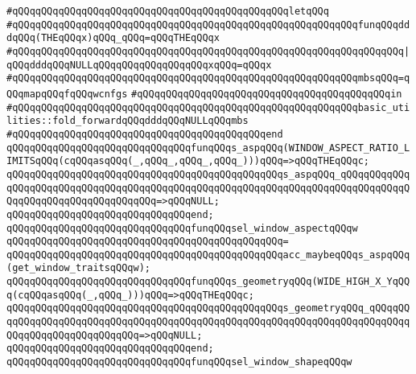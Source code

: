 \verb|#qQQqqQQqqQQqqQQqqQQqqQQqqQQqqQQqqQQqqQQqqQQqqQQqletqQQq|\newline
\verb|#qQQqqQQqqQQqqQQqqQQqqQQqqQQqqQQqqQQqqQQqqQQqqQQqqQQqqQQqqQQqfunqQQqdddqQQq(THEqQQqx)qQQq_qQQq=qQQqTHEqQQqx|\newline
\verb|#qQQqqQQqqQQqqQQqqQQqqQQqqQQqqQQqqQQqqQQqqQQqqQQqqQQqqQQqqQQqqQQqqQQq|\verb#|qQQqdddqQQqNULLqQQqqQQqqQQqqQQqqQQqxqQQq=qQQqx#\newline
\verb|#qQQqqQQqqQQqqQQqqQQqqQQqqQQqqQQqqQQqqQQqqQQqqQQqqQQqqQQqqQQqmbsqQQq=qQQqmapqQQqfqQQqwcnfgs|\newline
\verb|#qQQqqQQqqQQqqQQqqQQqqQQqqQQqqQQqqQQqqQQqqQQqin|\newline
\verb|#qQQqqQQqqQQqqQQqqQQqqQQqqQQqqQQqqQQqqQQqqQQqqQQqqQQqqQQqqQQqbasic_utilities::fold_forwardqQQqdddqQQqNULLqQQqmbs|\newline
\verb|#qQQqqQQqqQQqqQQqqQQqqQQqqQQqqQQqqQQqqQQqqQQqend|\newline
\newline
\newline
\verb|qQQqqQQqqQQqqQQqqQQqqQQqqQQqqQQqfunqQQqs_aspqQQq(WINDOW_ASPECT_RATIO_LIMITSqQQq(cqQQqasqQQq(_,qQQq_,qQQq_,qQQq_)))qQQq=>qQQqTHEqQQqc;|\newline
\verb|qQQqqQQqqQQqqQQqqQQqqQQqqQQqqQQqqQQqqQQqqQQqqQQqs_aspqQQq_qQQqqQQqqQQqqQQqqQQqqQQqqQQqqQQqqQQqqQQqqQQqqQQqqQQqqQQqqQQqqQQqqQQqqQQqqQQqqQQqqQQqqQQqqQQqqQQqqQQqqQQqqQQq=>qQQqNULL;|\newline
\verb|qQQqqQQqqQQqqQQqqQQqqQQqqQQqqQQqend;|\newline
\newline
\verb|qQQqqQQqqQQqqQQqqQQqqQQqqQQqqQQqfunqQQqsel_window_aspectqQQqw|\newline
\verb|qQQqqQQqqQQqqQQqqQQqqQQqqQQqqQQqqQQqqQQqqQQqqQQq=|\newline
\verb|qQQqqQQqqQQqqQQqqQQqqQQqqQQqqQQqqQQqqQQqqQQqqQQqacc_maybeqQQqs_aspqQQq(get_window_traitsqQQqw);|\newline
\newline
\verb|qQQqqQQqqQQqqQQqqQQqqQQqqQQqqQQqfunqQQqs_geometryqQQq(WIDE_HIGH_X_YqQQq(cqQQqasqQQq(_,qQQq_)))qQQq=>qQQqTHEqQQqc;|\newline
\verb|qQQqqQQqqQQqqQQqqQQqqQQqqQQqqQQqqQQqqQQqqQQqqQQqs_geometryqQQq_qQQqqQQqqQQqqQQqqQQqqQQqqQQqqQQqqQQqqQQqqQQqqQQqqQQqqQQqqQQqqQQqqQQqqQQqqQQqqQQqqQQqqQQqqQQqqQQqqQQq=>qQQqNULL;|\newline
\verb|qQQqqQQqqQQqqQQqqQQqqQQqqQQqqQQqend;|\newline
\newline
\verb|qQQqqQQqqQQqqQQqqQQqqQQqqQQqqQQqfunqQQqsel_window_shapeqQQqw|\newline
